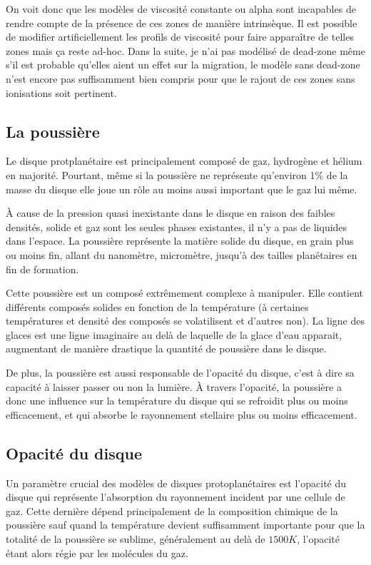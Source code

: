 On voit donc que les modèles de viscosité constante ou alpha sont incapables de rendre compte de la présence de ces zones de manière intrinsèque. Il est possible de modifier artificiellement les profils de viscosité pour faire apparaître de telles zones mais ça reste ad-hoc. Dans la suite, je n'ai pas modélisé de dead-zone même s'il est probable qu'elles aient un effet sur la migration, le modèle sans dead-zone n'est encore pas suffisamment bien compris pour que le rajout de ces zones sans ionisations soit pertinent.

\subsection{La poussière}
Le disque protplanétaire est principalement composé de gaz, hydrogène et hélium en majorité. Pourtant, même si la poussière ne représente qu'environ 1\% de la masse du disque elle joue un rôle au moins aussi important que le gaz lui même.

À cause de la pression quasi inexistante dans le disque en raison des faibles densités, solide et gaz sont les seules phases existantes, il n'y a pas de liquides dans l'espace. La poussière représente la matière solide du disque, en grain plus ou moins fin, allant du nanomètre, micromètre, jusqu'à des tailles planétaires en fin de formation. 

Cette poussière est un composé extrêmement complexe à manipuler. Elle contient différents composés solides en fonction de la température (à certaines températures et densité des composés se volatilisent et d'autres non). La ligne des glaces est une ligne imaginaire au delà de laquelle de la glace d'eau apparait, augmentant de manière drastique la quantité de poussière dans le disque. 

\bigskip

De plus, la poussière est aussi responsable de l'opacité du disque, c'est à dire sa capacité à laisser passer ou non la lumière. À travers l'opacité, la poussière a donc une influence sur la température du disque qui se refroidit plus ou moins efficacement, et qui absorbe le rayonnement stellaire plus ou moins efficacement. 

\subsection{Opacité du disque}
Un paramètre crucial des modèles de disques protoplanétaires est l'opacité du disque qui représente l'absorption du rayonnement incident par une cellule de gaz. Cette dernière dépend principalement de la composition chimique de la poussière sauf quand la température devient suffisamment importante pour que la totalité de la poussière se sublime, généralement au delà de $1500\unit{K}$, l'opacité étant alors régie par les molécules du gaz.

